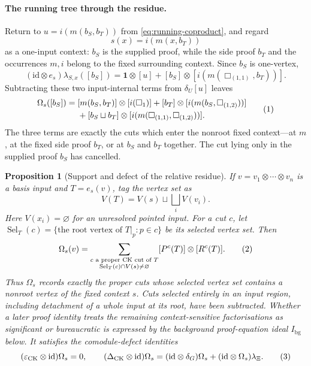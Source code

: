 \documentclass[10pt,a4paper]{article}
\theoremstyle{plain}
\newtheorem{proposition}[theorem]{Proposition}
\theoremstyle{definition}
\theoremstyle{remark}
\newcommand{\DeltaCK}{\Delta_{\mathrm{CK}}}
\newcommand{\epsCK}{\varepsilon_{\mathrm{CK}}}
\newcommand{\fjoin}{\mathbin{\sqcup}}
\newcommand{\one}{\mathbf 1}
\newcommand{\eqtag}{\refstepcounter{equation}\tag{\theequation}}
\begin{document}
\paragraph{The running tree through the residue.}
Return to \(u=i(m(b_S,b_T))\) from
\eqref{eq:running-coproduct}, and regard
\[
                  s(x)=i(m(x,b_T))
\]
as a one-input context: \(b_S\) is the supplied proof, while the side proof
 \(b_T\) and the occurrences \(m,i\) belong to the fixed surrounding
context.  Since \(b_S\) is one-vertex,
\[
 (\mathrm{id}\otimes e_s)\lambda_{S,x}([b_S])
   =\one\otimes[u]
      +[b_S]\otimes[i(m(\Box_{(1,1)},b_T))].
\]
Subtracting these two input-internal terms from
\(\delta_U[u]\) leaves
\[
\begin{aligned}
 \Omega_s([b_S])={}&
 [m(b_S,b_T)]\otimes[i(\Box_1)]
 +[b_T]\otimes[i(m(b_S,\Box_{(1,2)}))]\\
 &+[b_S\fjoin b_T]\otimes
       [i(m(\Box_{(1,1)},\Box_{(1,2)}))].
\end{aligned}
\eqtag\label{eq:running-relative-residue}
\]
The three terms are exactly the cuts which enter the nonroot fixed
context---at \(m\), at the fixed side proof \(b_T\), or at \(b_S\) and
\(b_T\) together.  The cut lying only in the supplied proof \(b_S\) has
cancelled.

\begin{proposition}[Support and defect of the relative residue]
\label{thm:context-relative-residue}
If \(v=v_1\otimes\cdots\otimes v_n\) is a basis input and
\(T=e_s(v)\), tag the vertex set as
\[
 V(T)=V(s)\sqcup\bigsqcup_iV(v_i).
\]
Here \(V(x_i)=\varnothing\) for an unresolved pointed input.
For a cut \(c\), let
\(\operatorname{Sel}_T(c)=\{\text{the root vertex of }T|_p:p\in c\}\)
be its selected vertex set.  Then
\[
 \Omega_s(v)=
 \sum_{\substack{c\text{ a proper CK cut of }T\\
                  \operatorname{Sel}_T(c)\cap V(s)\ne\varnothing}}
       [P^c(T)]\otimes[R^c(T)] .
\eqtag\label{eq:context-relative-cuts}
\]
Thus \(\Omega_s\) records exactly the proper cuts whose selected vertex
set contains a nonroot vertex of the fixed context \(s\).  Cuts
selected entirely in an input region, including detachment of a whole
input at its root, have been subtracted.  Whether a later proof identity
treats the remaining context-sensitive factorisations as significant or
bureaucratic is expressed by the background proof-equation ideal
\(I_{\mathrm{bg}}\)
below.
It satisfies the comodule-defect identities
\[
 (\epsCK\otimes\mathrm{id})\Omega_s=0,
 \qquad
 (\DeltaCK\otimes\mathrm{id})\Omega_s
   =(\mathrm{id}\otimes\delta_G)\Omega_s
      +(\mathrm{id}\otimes\Omega_s)\lambda_\Xi .
\eqtag\label{eq:context-relative-defect-law}
\]
\end{proposition}
\end{document}
